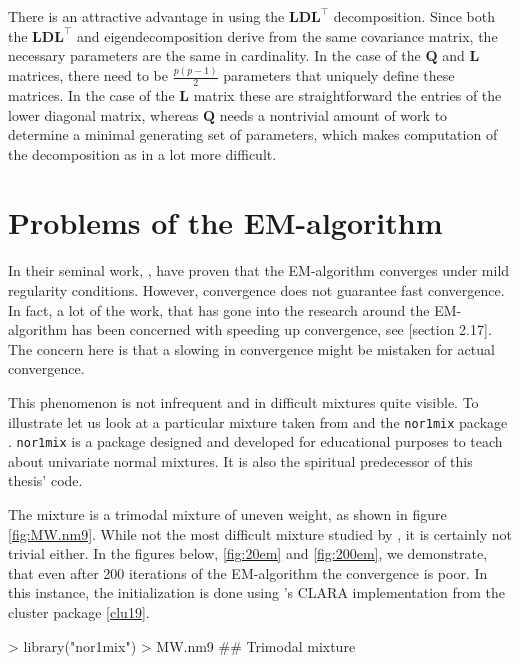 There is an attractive advantage in using the $\pmb{LDL}^\top$ decomposition.
Since both the $\pmb{LDL}^\top$ and eigendecomposition derive from the same 
covariance matrix, the necessary parameters are the same in cardinality.
In the case of the $\pmb{Q}$ and $\pmb{L}$ matrices, there need to be $\frac{p(p-1)}{2}$
parameters that uniquely define these matrices.
In the case of the $\pmb{L}$ matrix these are straightforward the entries of 
the lower diagonal matrix, whereas $\pmb{Q}$ needs a nontrivial amount of work
to determine a minimal generating set of parameters, which makes computation
of the decomposition as in \cite{Cel95} a lot more difficult.


\section{Problems of the EM-algorithm}
\label{sec:emproblems}

In their seminal work, \cite{Dem77}, have proven that the EM-algorithm 
converges under mild regularity conditions. However, convergence does not 
guarantee fast convergence. In fact, a lot of the work, that has gone into the 
research around the EM-algorithm has been concerned with speeding up 
convergence, see \cite{McL00}[section 2.17]. The concern here is that a slowing 
in convergence might be mistaken for actual convergence.

This phenomenon is not infrequent and in difficult mixtures quite visible.
To illustrate let us look at a particular mixture taken from \cite{Mar92} and
the {\tt nor1mix} package \cite{n1m19}.
{\tt nor1mix} is a package designed and developed for educational purposes to 
teach about univariate normal mixtures. It is also the spiritual predecessor 
of this thesis' \Rp code.

The mixture is a trimodal mixture of uneven weight, as shown in figure
\ref{fig:MW.nm9}. While not the most difficult mixture studied by \cite{Mar92}, 
it is certainly not trivial either. In the figures below, \ref{fig:20em} and 
\ref{fig:200em}, we demonstrate, that even after 200 iterations of the 
EM-algorithm the convergence is poor. In this instance, the initialization is 
done using \Rp's CLARA implementation from the cluster package \ref{clu19}.


\begin{Schunk}
\begin{Sinput}
>     library("nor1mix")
>     MW.nm9 ## Trimodal mixture
\end{Sinput}
\end{Schunk}

